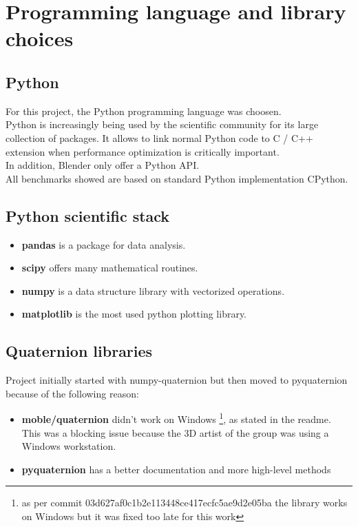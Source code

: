 \chapter{Programming language and library choices}
\label{chap:programming_language_library_choices}

\section{Python}
For this project, the Python programming language was choosen. \cite{python-website} \\
Python is increasingly being used by the scientific community for its large collection of packages. It allows to link normal Python code to C / C++ extension when performance optimization is critically important. \\
In addition, Blender only offer a Python API. \\
All benchmarks showed are based on standard Python implementation CPython.

\section{Python scientific stack}
\begin{itemize}
	\item \textbf{pandas} is a package for data analysis.
	\item \textbf{scipy} offers many mathematical routines.
	\item \textbf{numpy} is a data structure library with vectorized operations. %
	\item \textbf{matplotlib} is the most used python plotting library.
\end{itemize}

\section{Quaternion libraries}

Project initially started with numpy-quaternion \cite{numpy-quaternion} but then moved to pyquaternion \cite{pyquaternion} because of the following reason:
\begin{itemize}
\item \textbf{moble/quaternion} didn't work on Windows \footnote{ as per commit 03d627af0c1b2e113448ce417ecfc5ae9d2e05ba the library works on Windows but it was fixed too late for this work}, as stated in the readme. This was a blocking issue because the 3D artist of the group was using a Windows workstation.
\item \textbf{pyquaternion} has a better documentation and more high-level methods
\end{itemize}

